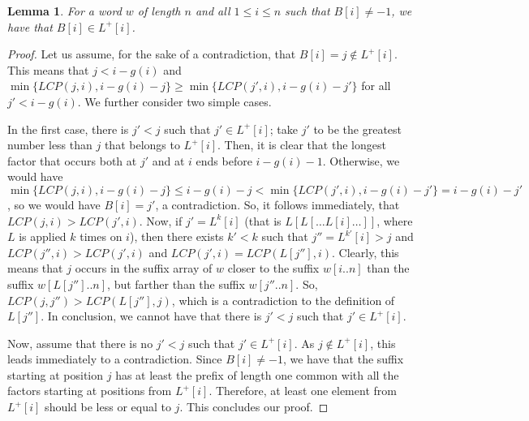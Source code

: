 \documentclass[final]{dmtcs-episciences}
\newcommand{\LCP}{{\mathit{LCP}}}
\newtheorem{lemma}{Lemma}
\begin{document}
\begin{lemma}\label{iterated_L}
For a word $w$ of length $n$ and all $1\leq i\leq n$ such that $B[i]\neq -1$, we have that $B[i]\in L^+[i]$. 
\end{lemma}
\begin{proof}
Let us assume, for the sake of a contradiction, that $B[i]=j\notin L^+[i]$. This means that $j<i-g(i)$ and $\min\{\LCP(j,i), i-g(i) -j\}\geq \min\{\LCP(j',i), i-g(i) -j'\}$ for all $j'< i-g(i)$. We further consider two simple cases.

In the first case, there is $j'<j$ such that $j'\in L^+[i]$; take $j'$ to be the greatest number less than $j$ that belongs to $L^+[i]$. Then, it is clear that the longest factor that occurs both at $j'$ and at $i$ ends before $i-g(i)-1$. Otherwise, we would have $\min\{\LCP(j,i), i-g(i) -j\}\leq i-g(i)-j < \min\{\LCP(j',i), i-g(i) -j'\}=i-g(i) -j'$, so we would have $B[i]=j'$, a contradiction. So, it follows immediately, that $\LCP(j,i)>\LCP(j',i)$. Now, if $j'=L^k[i]$ (that is $L[L[\ldots L[i]\ldots]]$, where $L$ is applied $k$ times on $i$), then there exists $k'<k$ such that $j''=L^{k'}[i]>j$ and $\LCP(j'',i)>\LCP(j',i)$ and $\LCP(j',i)=\LCP(L[j''],i)$. Clearly, this means that $j$ occurs in the suffix array of $w$ closer to the suffix $w[i..n]$ than the suffix $w[L[j'']..n]$, but farther than the suffix $w[j''..n]$. So, $\LCP(j,j'')>\LCP(L[j''],j)$, which is a contradiction to the definition of $L[j'']$. In conclusion, we cannot have that there is $j'<j$ such that $j'\in L^+[i]$.

Now, assume that there is no $j'<j$ such that $j'\in L^+[i]$. As $j\notin L^+[i]$, this leads immediately to a contradiction. Since $B[i]\neq -1$, we have that the suffix starting at position $j$ has at least the prefix of length one common with all the factors starting at positions from $L^+[i]$. Therefore, at least one element from $L^+[i]$ should be less or equal to $j$. 
This concludes our proof.
\end{proof}
\end{document}
